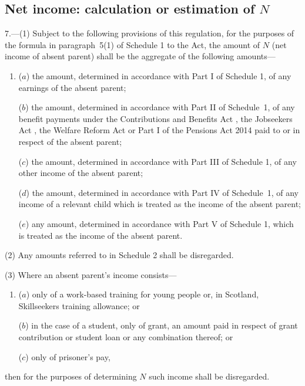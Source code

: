 \documentclass[12pt,a4paper]{article}
\begin{document}
\subsection[7. Net income: calculation or estimation of N]{Net income: calculation or estimation of $N$}

7.—(1) Subject to the following provisions of this regulation, for the purposes of the formula in paragraph~5(1) of Schedule 1 to the Act, the amount of $N$ (net income of absent parent) shall be the aggregate of the following amounts—
\begin{enumerate}\item[]
($a$) the amount, determined in accordance with Part I of Schedule 1, of any earnings of the absent parent;

($b$) the amount, determined in accordance with Part II of Schedule~1, of any benefit payments under the Contributions and Benefits Act%
, the Jobseekers Act%
, the Welfare Reform Act or Part I of the Pensions Act 2014  %
paid to or in respect of the absent parent;

($c$) the amount, determined in accordance with Part III of Schedule 1, of any other income of the absent parent;

($d$) the amount, determined in accordance with Part IV of Schedule~1, of any income of a relevant child which is treated as the income of the absent parent;

($e$) any amount, determined in accordance with Part V of Schedule 1, which is treated as the income of the absent parent.
\end{enumerate}

(2) Any amounts referred to in Schedule 2 shall be disregarded.

(3) Where an absent parent’s income consists—
\begin{enumerate}\item[]
($a$) only of a 
work-based training for young people or, in Scotland, Skillseekers training  %
allowance; or

($b$) in the case of a student, only of grant, an amount paid in respect of grant contribution or student loan or any combination thereof; or

($c$) only of prisoner’s pay,
\end{enumerate}
then for the purposes of determining $N$ such income shall be disregarded.
\end{document}
